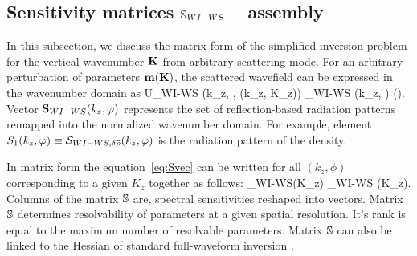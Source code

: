 \subsection{Sensitivity matrices $\mathbb{S}_{WI-WS}$ -- assembly}
In this subsection, we discuss the matrix form of the simplified inversion problem for the vertical wavenumber $\mathbf{K}$ from arbitrary scattering mode.   
%
For an arbitrary perturbation of parameters $\mathbf{m} (\mathbf{K})$, the scattered wavefield can be expressed in the wavenumber domain as
\vspace*{-0.02\columnwidth}
\beq \label{eq:Svec}
\delta U_{WI-WS} (k_z, \phi, \omega(k_z, K_z)) \propto \Sv_{WI-WS} (k_z, \varphi) \delta \mv (\Kv).
\eeq
Vector $\mathbf{S}_{WI-WS}(k_z,\varphi)$ represents the set of reflection-based radiation patterns remapped into the normalized wavenumber domain. For example, element $S_1(k_z,\varphi) \equiv \mathcal{S}_{WI-WS,\delta \mathbf{\bar{\text{$\rho$}}}}(k_z,\varphi)$ is the radiation pattern of the density.

In matrix form the equation~\eqref{eq:Svec} can be written for all $(k_z,\phi)$ corresponding to a given $K_z$ together as follows:
\beq
\delta \Uv_{WI-WS}(K_z) \propto \Smat_{WI-WS} \delta \mv(K_z).
\eeq
Columns of the matrix $\mathbb{S}$ are, spectral sensitivities reshaped into vectors. Matrix $\mathbb{S}$ determines resolvability of parameters at a given spatial resolution. It's rank is equal to the maximum number of resolvable parameters. Matrix $\mathbb{S}$ can also be linked to the Hessian of standard full-waveform inversion \citep{kazei2018, podgornova2018}.

%

